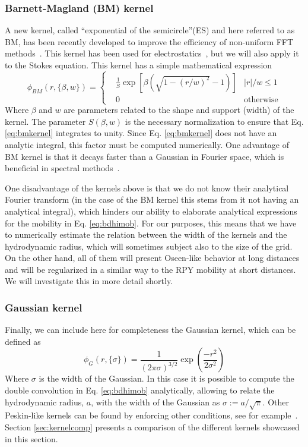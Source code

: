 \documentclass[twoside,openright,titlepage,numbers=noenddot,%
headinclude,footinclude,cleardoublepage=empty,abstract=on,
BCOR=5mm,fontsize=11pt, dvipsnames, paper=b5
]{scrreprt}
\begin{document}
\subsubsection*{Barnett-Magland (BM) kernel}
A new kernel, called ``exponential of the semicircle''(ES) and here referred to as BM, has been recently developed to improve the efficiency of non-uniform \gls{FFT} methods~\cite{Barnett2019}. This kernel has been used for electrostatics~\cite{Shamshirgar2021}, but we will also apply it to the Stokes equation. This kernel has a simple mathematical expression
\begin{equation}
  \label{eq:bmkernel}
  \phi_{BM}(r,\{\beta, w\}) = \left\{
  \begin{aligned}
    &\frac{1}{S}\exp\left[\beta(\sqrt{1-(r/w)^2}-1)\right] & |r|/w\le 1\\
    & 0 & \textrm{otherwise}
  \end{aligned}\right.
\end{equation}
Where $\beta$ and $w$ are parameters related to the shape and support (width) of the kernel. The parameter $S(\beta, w)$ is the necessary normalization to ensure that Eq. \eqref{eq:bmkernel} integrates to unity. Since Eq. \eqref{eq:bmkernel} does not have an analytic integral, this factor must be computed numerically. One advantage of BM kernel is that it decays faster than a Gaussian in Fourier space, which is beneficial in spectral methods~\cite{Barnett2019}.

One disadvantage of the kernels above is that we do not know their analytical Fourier transform (in the case of the BM kernel this stems from it not having an analytical integral), which hinders our ability to elaborate analytical expressions for the mobility in Eq. \eqref{eq:bdhimob}.
For our purposes, this means that we have to numerically estimate the relation between the width of the kernels and the hydrodynamic radius, which will sometimes subject also to the size of the grid.
On the other hand, all of them will present Oseen-like behavior at long distances and will be regularized in a similar way to the \gls{RPY} mobility at short distances.
We will investigate this in more detail shortly.
\subsubsection*{Gaussian kernel}
Finally, we can include here for completeness the Gaussian kernel, which can be defined as
\begin{equation}
  \label{eq:gaussiankernel}
  \phi_G(r,\{\sigma\}) = \frac{1}{(2\pi\sigma)^{3/2}}\exp\left(\frac{-r^2}{2\sigma^2}\right)
\end{equation}
Where $\sigma$ is the width of the Gaussian.
In this case it is possible to compute the double convolution in Eq. \eqref{eq:bdhimob} analytically, allowing to relate the hydrodynamic radius, $a$, with the width of the Gaussian as $\sigma := a/\sqrt{\pi}$.
Other Peskin-like kernels can be found by enforcing other conditions, see for example~\cite{Yang2009}.
Section \ref{sec:kernelcomp} presents a comparison of the different kernels showcased in this section.
\end{document}
